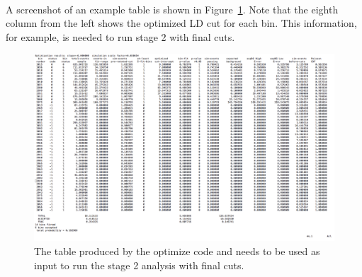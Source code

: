 \begin{center}
\\
\end{center}

A screenshot of an example table is shown in Figure~\ref{opt_table}. Note that the eighth column from the left shows the optimized LD cut for each bin. This information, for example, is needed to run stage 2 with final cuts. 

\begin{figure}
\centering
\includegraphics[width=1.0\textwidth]{figures/optimize_table.png}
\caption{The table produced by the optimize code and needs to be used as input to run the stage 2 analysis with final cuts.}
\label{opt_table}
\end{figure}














